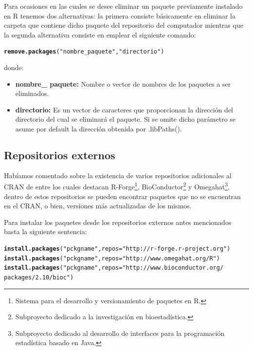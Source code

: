\documentclass[11pt,a4paper,oneside]{book}\usepackage[]{graphicx}\usepackage[]{color}
\makeatletter
\newcommand{\hlstr}[1]{\textcolor[rgb]{0.192,0.494,0.8}{#1}}%
\newcommand{\hlstd}[1]{\textcolor[rgb]{0.345,0.345,0.345}{#1}}%
\newcommand{\hlkwc}[1]{\textcolor[rgb]{0.333,0.667,0.333}{#1}}%
\newcommand{\hlkwd}[1]{\textcolor[rgb]{0.737,0.353,0.396}{\textbf{#1}}}%
\newenvironment{kframe}{%
 \def\at@end@of@kframe{}%
 \ifinner\ifhmode%
  \def\at@end@of@kframe{\end{minipage}}%
  \begin{minipage}{\columnwidth}%
 \fi\fi%
 \def\FrameCommand##1{\hskip\@totalleftmargin \hskip-\fboxsep
 \colorbox{shadecolor}{##1}\hskip-\fboxsep
     \hskip-\linewidth \hskip-\@totalleftmargin \hskip\columnwidth}%
 \MakeFramed {\advance\hsize-\width
   \@totalleftmargin\z@ \linewidth\hsize
   \@setminipage}}%
 {\par\unskip\endMakeFramed%
 \at@end@of@kframe}
\newenvironment{knitrout}{}{} %
\makeatother
\begin{document}
\begin{itemize}
Para ocasiones en las cuales se desee eliminar un paquete previamente instalado en R tenemos dos alternativas: la primera consiste básicamente en eliminar la carpeta que contiene dicho paquete del repositorio del computador mientras que la segunda alternativa consiste en emplear el siguiente comando:
\begin{knitrout}
\color{fgcolor}\begin{kframe}
\begin{alltt}
\hlkwd{remove.packages}\hlstd{(}\hlstr{"nombre_paquete"}\hlstd{,} \hlstr{"directorio"}\hlstd{)}
\end{alltt}
\end{kframe}
\end{knitrout}
donde: 
\begin{itemize}
   \item {\bf nombre\_ paquete:} Nombre o vector de nombres de los paquetes a ser eliminados.
   \item {\bf directorio:} Es un vector de caracteres que proporcionan la dirección del directorio del cual se eliminará el paquete. Si se omite dicho parámetro se asume por default la dirección obtenida por .libPaths().
\end{itemize}


\subsection{Repositorios externos}

Habíamos comentado sobre la existencia de varios repositorios adicionales al CRAN de entre los cuales destacan R-Forge\footnote{Sistema para el desarrollo y versionamiento de paquetes en R.}, BioConductor\footnote{Subproyecto dedicado a la investigación en bioestadística.} y Omegahat\footnote{Subproyecto dedicado al desarrollo de interfaces para la programación estadística basado en Java.}, dentro de estos repositorios se pueden encontrar paquetes que no se encuentran en el CRAN, o bien, versiones más actualizadas de los mismos.\newline

Para instalar los paquetes desde los repositorios externos antes mencionados basta la siguiente sentencia:
\begin{knitrout}
\color{fgcolor}\begin{kframe}
\begin{alltt}
\hlkwd{install.packages}\hlstd{(}\hlstr{"pckgname"}\hlstd{,} \hlkwc{repos}\hlstd{=}\hlstr{"http://r-forge.r-project.org"}\hlstd{)}
\hlkwd{install.packages}\hlstd{(}\hlstr{"pckgname"}\hlstd{,} \hlkwc{repos}\hlstd{=}\hlstr{"http://www.omegahat.org/R"}\hlstd{)}
\hlkwd{install.packages}\hlstd{(}\hlstr{"pckgname"}\hlstd{,} \hlkwc{repos}\hlstd{=}\hlstr{"http://www.bioconductor.org/
                                    packages/2.10/bioc"}\hlstd{)}
\end{alltt}
\end{kframe}
\end{knitrout}


\end{itemize}
\end{document}
